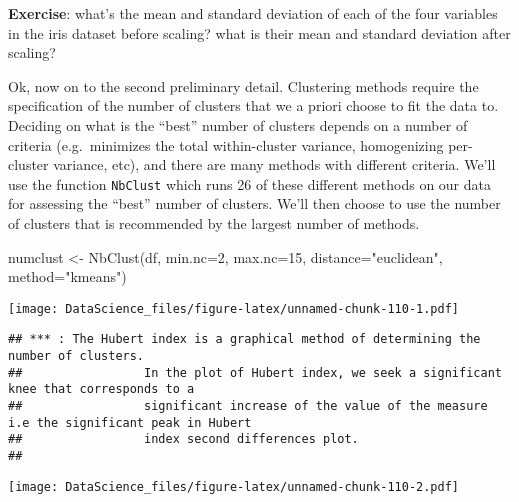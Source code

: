 \documentclass[
]{book}
\newenvironment{Shaded}{\begin{snugshade}}{\end{snugshade}}
\newcommand{\AttributeTok}[1]{\textcolor[rgb]{0.77,0.63,0.00}{#1}}
\newcommand{\DecValTok}[1]{\textcolor[rgb]{0.00,0.00,0.81}{#1}}
\newcommand{\FunctionTok}[1]{\textcolor[rgb]{0.00,0.00,0.00}{#1}}
\newcommand{\NormalTok}[1]{#1}
\newcommand{\OtherTok}[1]{\textcolor[rgb]{0.56,0.35,0.01}{#1}}
\newcommand{\StringTok}[1]{\textcolor[rgb]{0.31,0.60,0.02}{#1}}
\begin{document}
\textbf{Exercise}: what's the mean and standard deviation of each of the four variables in the iris dataset before scaling? what is their mean and standard deviation after scaling?

Ok, now on to the second preliminary detail. Clustering methods require the specification of the number of clusters that we a priori choose to fit the data to. Deciding on what is the ``best'' number of clusters depends on a number of criteria (e.g.~minimizes the total within-cluster variance, homogenizing per-cluster variance, etc), and there are many methods with different criteria. We'll use the function \texttt{NbClust} which runs 26 of these different methods on our data for assessing the ``best'' number of clusters. We'll then choose to use the number of clusters that is recommended by the largest number of methods.

\begin{Shaded}
\begin{Highlighting}[]
\NormalTok{numclust }\OtherTok{\textless{}{-}} \FunctionTok{NbClust}\NormalTok{(df, }\AttributeTok{min.nc=}\DecValTok{2}\NormalTok{, }\AttributeTok{max.nc=}\DecValTok{15}\NormalTok{, }\AttributeTok{distance=}\StringTok{"euclidean"}\NormalTok{, }\AttributeTok{method=}\StringTok{"kmeans"}\NormalTok{)}
\end{Highlighting}
\end{Shaded}

\texttt{[image: DataScience\_files/figure-latex/unnamed-chunk-110-1.pdf]}

\begin{verbatim}
## *** : The Hubert index is a graphical method of determining the number of clusters.
##                 In the plot of Hubert index, we seek a significant knee that corresponds to a 
##                 significant increase of the value of the measure i.e the significant peak in Hubert
##                 index second differences plot. 
## 
\end{verbatim}

\texttt{[image: DataScience\_files/figure-latex/unnamed-chunk-110-2.pdf]}
\end{document}
